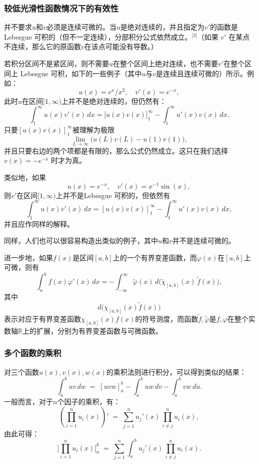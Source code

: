 \subsubsection{较低光滑性函数情况下的有效性}
并不要求$u$和$v$必须是连续可微的。当$u$是绝对连续的，并且指定为$v'$的函数是Lebesgue 可积的（但不一定连续），分部积分公式依然成立。\(^\text{[3]}\)（如果 $v'$ 在某点不连续，那么它的原函数$v$在该点可能没有导数。）

若积分区间不是紧区间，则不需要$u$在整个区间上绝对连续，也不需要$v'$在整个区间上 Lebesgue 可积，如下的一些例子（其中$u$与$v$是连续且连续可微的）所示。例如：
$$
u(x) = e^x/x^2, \quad v'(x) = e^{-x},~
$$
此时$u$在区间$[1,\infty)$上并不是绝对连续的，但仍然有：
$$
\int_{1}^{\infty} u(x)v'(x)\,dx 
= \Big[u(x)v(x)\Big]_{1}^{\infty} - \int_{1}^{\infty} u'(x)v(x)\,dx .~
$$
只要$[u(x)v(x)]_{1}^{\infty}$被理解为极限
$$
\lim_{L \to \infty} \big(u(L)v(L) - u(1)v(1)\big),~
$$
并且只要右边的两个项都是有限的，那么公式仍然成立。这只在我们选择$v(x) = -e^{-x}$
时才为真。

类似地，如果
$$
u(x) = e^{-x}, \quad v'(x) = x^{-1}\sin(x),~
$$
则$v'$在区间$[1,\infty)$上并不是Lebesgue 可积的，但依然有
$$
\int_{1}^{\infty} u(x)v'(x)\,dx = [u(x)v(x)]_{1}^{\infty} - \int_{1}^{\infty} u'(x)v(x)\,dx,~
$$
并且应作同样的解释。

同样，人们也可以很容易构造出类似的例子，其中$u$和$v$并不是连续可微的。

进一步地，如果$f(x)$是区间$[a,b]$上的一个有界变差函数，而$\varphi(x)$在$[a,b]$上可微，则有
$$
\int_{a}^{b} f(x)\varphi'(x)\,dx = -\int_{-\infty}^{\infty} \widetilde{\varphi}(x)\, d\big(\widetilde{\chi}_{[a,b]}(x)\,\widetilde{f}(x)\big),~
$$
其中
$$
d\big(\chi_{[a,b]}(x)\widetilde{f}(x)\big)~
$$
表示对应于有界变差函数$\chi_{[a,b]}(x)f(x)$的符号测度，而函数$\widetilde{f}, \widetilde{\varphi}$是$f, \varphi$在整个实数轴$\mathbb{R}$上的扩展，分别为有界变差函数与可微函数。
\subsubsection{多个函数的乘积}
对三个函数$u(x), v(x), w(x)$的乘积法则进行积分，可以得到类似的结果：
$$
\int_{a}^{b} uv\,dw \;=\; [uvw]_{a}^{b} - \int_{a}^{b} uw\,dv - \int_{a}^{b} vw\,du.~
$$
一般而言，对于$n$个因子的乘积，有：
$$
\left(\prod_{i=1}^{n} u_i(x)\right)' \;=\; \sum_{j=1}^{n} u_j'(x)\,\prod_{i \neq j}^{n} u_i(x),~
$$
由此可得：
$$
\Bigg[\prod_{i=1}^{n} u_i(x)\Bigg]_{a}^{b} \;=\; \sum_{j=1}^{n} \int_{a}^{b} u_j'(x)\,\prod_{i \neq j}^{n} u_i(x).~
$$
